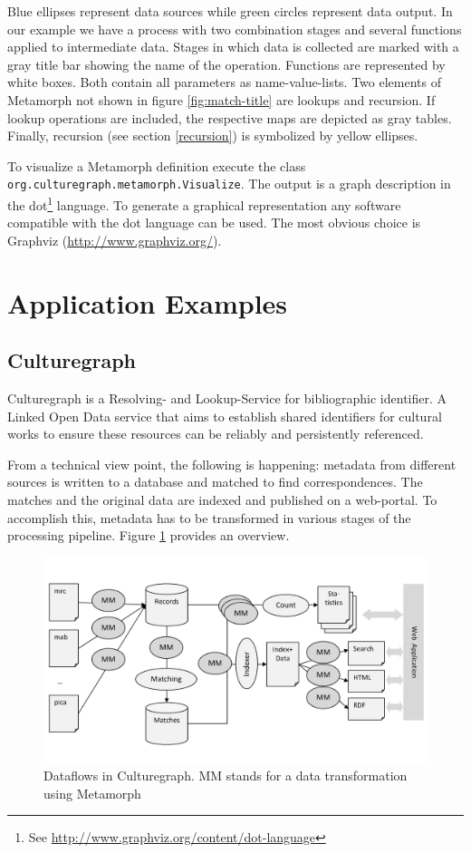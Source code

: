 \documentclass[12pt,a4paper]{article}
\begin{document}
Blue ellipses represent data sources while green circles represent data output. In our example we have a process with two combination stages and several functions applied to intermediate data. Stages in which data is collected are marked with a gray title bar showing the name of the operation. Functions are represented by white boxes. Both contain all parameters as name-value-lists. 
Two elements of Metamorph not shown in figure \ref{fig:match-title} are lookups and recursion. If lookup operations are included, the respective maps are depicted as gray tables. Finally, recursion (see section \ref{recursion}) is symbolized by yellow ellipses.

To visualize a Metamorph definition execute the class {\tt org.\-culturegraph.\-metamorph.\-Visualize}. The output is a graph description in the dot\footnote{See \url{http://www.graphviz.org/content/dot-language}} language. To generate a graphical representation any software compatible with the dot language can be used. The most obvious choice is Graphviz (\url{http://www.graphviz.org/}). 


\section{Application Examples}\label{apps}


\subsection{Culturegraph}\label{culturegraph}
Culturegraph is a Resolving- and Lookup-Service for bibliographic identifier. A Linked Open Data service that aims to establish shared identifiers for cultural works to ensure these resources can be reliably and persistently referenced.

From a technical view point, the following is happening: metadata from different sources is written to a database and matched to find correspondences. The matches and the original data are indexed and published on a web-portal. To accomplish this, metadata has to be transformed in various stages of the processing pipeline. Figure \ref{fig:flow} provides an overview.

\begin{figure}[htp]
\centering
\includegraphics[width=.96\textwidth]{figures/flow}
\caption{Dataflows in Culturegraph. MM stands for a data transformation using Metamorph}\label{fig:flow}
\end{figure}
\end{document}

